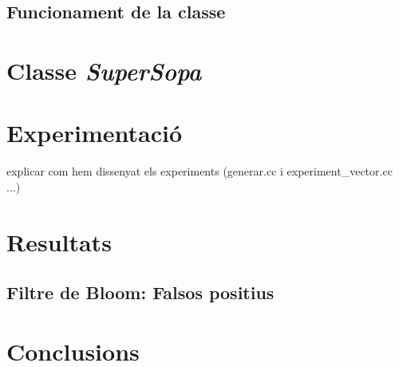 \documentclass[titlepage]{article}
\begin{document}
\subsection{Funcionament de la classe}

\clearpage
\section{Classe \textit{SuperSopa}}

\clearpage
\section{Experimentació}
explicar com hem dissenyat els experiments (generar.cc i experiment\_vector.cc ...)

\clearpage
\section{Resultats}
\subsection{Filtre de Bloom: Falsos positius}

\clearpage
\section{Conclusions}

\clearpage
\end{document}
